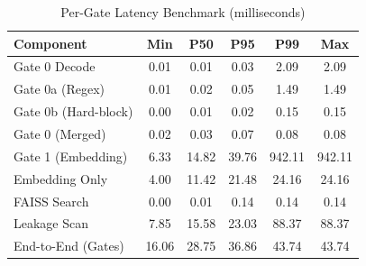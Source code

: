 \begin{table}[htbp]
\centering
\caption{Per-Gate Latency Benchmark (milliseconds)}
\label{tab:latency}
\begin{tabular}{lccccc}
\toprule
\textbf{Component} & \textbf{Min} & \textbf{P50} & \textbf{P95} & \textbf{P99} & \textbf{Max} \\
\midrule
  Gate 0 Decode & 0.01 & 0.01 & 0.03 & 2.09 & 2.09 \\
  Gate 0a (Regex) & 0.01 & 0.02 & 0.05 & 1.49 & 1.49 \\
  Gate 0b (Hard-block) & 0.00 & 0.01 & 0.02 & 0.15 & 0.15 \\
  Gate 0 (Merged) & 0.02 & 0.03 & 0.07 & 0.08 & 0.08 \\
  Gate 1 (Embedding) & 6.33 & 14.82 & 39.76 & 942.11 & 942.11 \\
  Embedding Only & 4.00 & 11.42 & 21.48 & 24.16 & 24.16 \\
  FAISS Search & 0.00 & 0.01 & 0.14 & 0.14 & 0.14 \\
  Leakage Scan & 7.85 & 15.58 & 23.03 & 88.37 & 88.37 \\
  End-to-End (Gates) & 16.06 & 28.75 & 36.86 & 43.74 & 43.74 \\
\bottomrule
\end{tabular}
\end{table}
